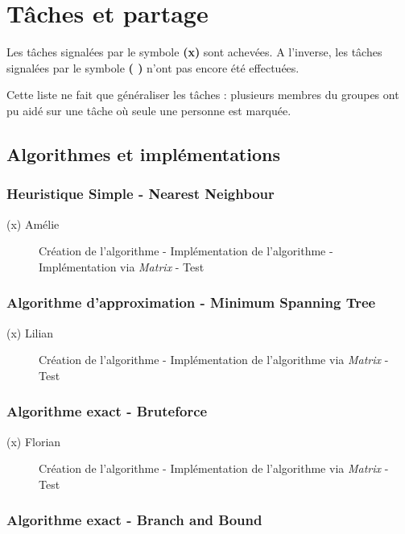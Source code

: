 \chapter{Tâches et partage}

Les tâches signalées par le symbole \textbf{(x)} sont achevées. A l'inverse, les tâches signalées par le symbole \textbf{( )} n'ont pas encore été effectuées.

Cette liste ne fait que généraliser les tâches : plusieurs membres du groupes ont pu aidé sur une tâche où seule une personne est marquée. 

\section{Algorithmes et implémentations}

\subsection{Heuristique Simple - Nearest Neighbour}

\begin{description}
	\item[(x) Amélie] Création de l'algorithme - Implémentation de l'algorithme - Implémentation via \textit{Matrix} - Test 
\end{description}

\subsection{Algorithme d'approximation - Minimum Spanning Tree}

\begin{description}
	\item[(x) Lilian] Création de l'algorithme - Implémentation de l'algorithme via \textit{Matrix} - Test
\end{description}

\subsection{Algorithme exact - Bruteforce}

\begin{description}
	\item[(x) Florian] Création de l'algorithme - Implémentation de l'algorithme via \textit{Matrix} - Test
\end{description}

\subsection{Algorithme exact - Branch and Bound}


